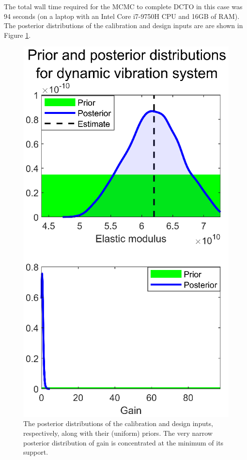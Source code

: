 \documentclass[twocolumn,10pt]{asme2ej}
\begin{document}
%
The total wall time required for the MCMC to complete DCTO in this case was 94 seconds (on a laptop with an Intel Core i7-9750H CPU and 16GB of RAM).
%
The posterior distributions of the calibration and design inputs are are shown in Figure \ref{fig:dvs_calib_and_design}.
%
\begin{figure}
	\centering
	\includegraphics[scale=0.85]{FIG_DVS_DCTO_input_posteriors}
	\captionsetup{width=.85\linewidth}
	\caption{The posterior distributions of the calibration and design inputs, respectively, along with their (uniform) priors. The very narrow posterior distribution of gain is concentrated at the minimum of its support.}
	\label{fig:dvs_calib_and_design}
\end{figure}
\end{document}
